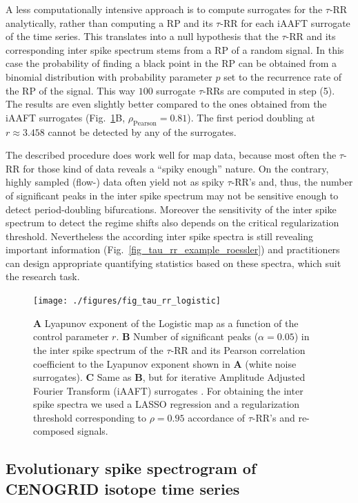 A less computationally intensive approach is to compute surrogates for the $\tau$-RR analytically, rather than computing a RP and its $\tau$-RR for each iAAFT surrogate of the 
time series. This translates into a null hypothesis 
that the $\tau$-RR and its corresponding inter spike spectrum stems from a RP of a random signal. In this case the probability of finding a black point in the RP can be obtained 
from a binomial distribution with probability parameter $p$ set to the recurrence rate of the RP of the signal. This way $100$ surrogate $\tau$-RRs are computed in step (5). 
The results are even slightly better compared to the ones obtained from the iAAFT surrogates (Fig.~\ref{fig_tau_rr_logistic}B, $\rho_{\text{Pearson}}=0.81$). The first period doubling at 
$r \approx 3.458$ cannot be detected by any of the surrogates.

The described procedure does work well for map data, because most often the $\tau$-RR for those kind of data reveals a ``spiky enough'' nature. 
On the contrary, highly sampled (flow-) data often yield not as 
spiky $\tau$-RR's and, thus, the number of significant peaks in the inter spike spectrum may not be sensitive enough to detect period-doubling bifurcations. Moreover the sensitivity of the 
inter spike spectrum to detect the regime shifts also depends on the critical regularization threshold. Nevertheless the 
according inter spike spectra is still revealing important information (Fig.~\ref{fig_tau_rr_example_roessler}) and practitioners can design appropriate quantifying statistics based 
on these spectra, which suit the 
research task.

\begin{figure}
 \centering
 \texttt{[image: ./figures/fig\_tau\_rr\_logistic]}
 \caption{\textbf{A} Lyapunov exponent of the Logistic map as a function of the control parameter $r$. 
 \textbf{B} Number of significant peaks ($\alpha=0.05$) in the inter spike spectrum of the $\tau$-RR and its Pearson correlation coefficient to the Lyapunov exponent shown in \textbf{A} 
 (white noise surrogates). 
 \textbf{C} Same as \textbf{B}, but for iterative Amplitude Adjusted Fourier Transform (iAAFT) surrogates \cite{Schreiber1996,Schreiber2000}. For obtaining the inter spike spectra we used 
 a LASSO regression and a regularization threshold corresponding to $\rho=0.95$ accordance of $\tau$-RR's and re-composed signals.  
}
\label{fig_tau_rr_logistic}
\end{figure}

\subsection{Evolutionary spike spectrogram of CENOGRID isotope time series}


